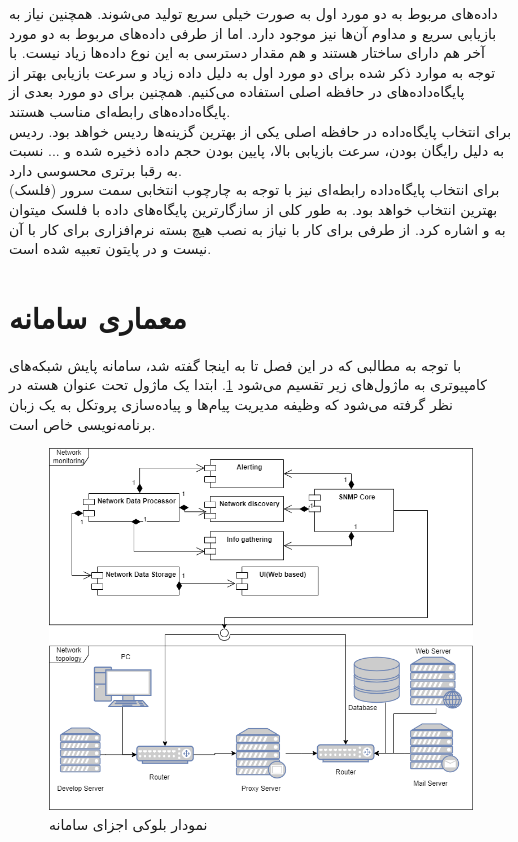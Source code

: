 داده‌های مربوط به دو مورد اول به صورت خیلی سریع تولید می‌شوند. همچنین نیاز به بازیابی سریع و مداوم آن‌ها نیز موجود دارد. اما از طرفی داده‌های مربوط به دو مورد آخر هم دارای ساختار هستند و هم مقدار دسترسی به این نوع داده‌ها زیاد نیست. با توجه به موارد ذکر شده برای دو مورد اول به دلیل داده زیاد و سرعت بازیابی بهتر از پایگاه‌داده‌های در حافظه اصلی استفاده می‌کنیم. همچنین برای دو مورد بعدی از پایگاه‌داده‌های رابطه‌ای مناسب هستند.
\\
برای انتخاب پایگاه‌داده‌ در حافظه اصلی یکی از بهترین گزینه‌ها ردیس خواهد بود. ردیس به دلیل رایگان بودن، سرعت بازیابی بالا، پایین بودن حجم داده ذخیره شده و ... نسبت به رقبا برتری محسوسی دارد.
\\
برای انتخاب پایگاه‌داده رابطه‌ای نیز با توجه به چارچوب انتخابی سمت سرور (فلسک)  بهترین انتخاب خواهد بود. به طور کلی از سازگارترین پایگاه‌های داده با فلسک میتوان به  و  اشاره کرد. از طرفی برای کار با  نیاز به نصب هیچ بسته نرم‌افزاری برای کار با آن نیست و در پایتون تعبیه شده است.



\newpage

\section{معماری سامانه}




با توجه به مطالبی که در این فصل تا به اینجا گفته شد، سامانه پایش شبکه‌های کامپیوتری به ماژول‌های زیر تقسیم می‌شود \cref{fig.11}. ابتدا یک ماژول تحت عنوان هسته  در نظر گرفته می‌شود که وظیفه مدیریت پیام‌ها و پیاده‌سازی پروتکل به یک زبان برنامه‌نویسی خاص است.




\begin{figure}[!h]
\centering\includegraphics[scale=.55]{./diagram}
\caption{نمودار بلوکی اجزای سامانه}\label{fig.11}
\end{figure}


